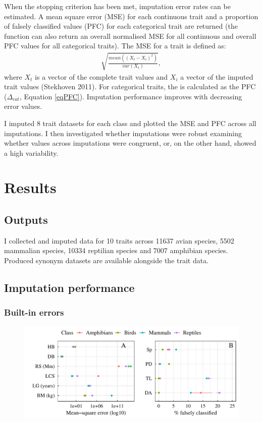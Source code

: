 When the stopping criterion has been met, imputation error rates can be estimated. A mean square error (MSE) for each continuous trait and a proportion of falsely classified values (PFC) for each categorical trait are returned (the function can also return an overall normalised MSE for all continuous and overall PFC values for all categorical traits). The MSE for a trait is defined as:
\begin{align}
\sqrt{\frac{mean\left(\left(X_t-X_i\right)^2\right)}{var\left(X_t\right)}}, 
\end{align}
where $X_t$ is a vector of the complete trait values and $X_i$ a vector of the imputed trait values (Stekhoven 2011). For categorical traits, the  is calculated as the PFC ($\Delta_{cat}$, Equation \ref{eqPFC}). Imputation performance improves with decreasing error values.

I imputed 8 trait datasets for each class and plotted the MSE and PFC across all imputations. I then investigated whether imputations were robust examining whether values across imputations were congruent, or, on the other hand, showed a high variability.


\pagebreak
\section{Results}

\subsection{Outputs}
I collected and imputed data for 10 traits across 11637 avian species, 5502 mammalian species, 10334 reptilian species and 7007 amphibian species. Produced synonym datasets are available alongside the trait data. 

\subsection{Imputation performance}
\subsubsection{Built-in errors}

\begin{figure}[h!]
\centering
\includegraphics[scale=0.75]{figures/chapter2/Imputation_errors/MSE_PFC}
\caption[]{}
\label{plotPFC}
\end{figure}


